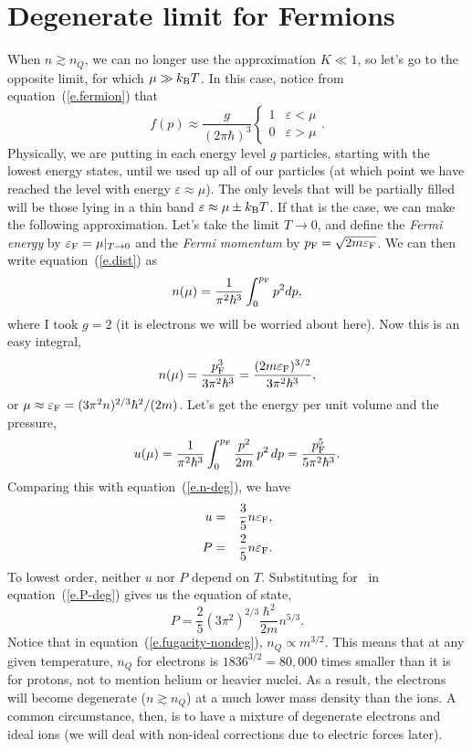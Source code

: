 \section{Degenerate limit for Fermions}\label{s.deg-limit-fermions}
When $n\gtrsim n_{Q}$, we can no longer use the approximation $K \ll 1$, so let's go to the opposite limit, for which $\mu \gg k_\mathrm{B} T$.  In this case, notice from equation~(\ref{e.fermion}) that
\begin{equation}
f(p) \approx \frac{g}{(2\pi\hbar)^{3}}\left\{\begin{array}{lr} 1 & \varepsilon < \mu\\ 0 & \varepsilon> \mu\end{array}\right. .
\end{equation}
Physically, we are putting in each energy level $g$ particles, starting with the lowest energy states, until we used up all of our particles (at which point we have reached the level with energy $\varepsilon \approx \mu$).  The only levels that will be partially filled will be those lying in a thin band $\varepsilon \approx\mu \pm k_\mathrm{B} T$.  If that is the case, we can make the following approximation.  Let's take the limit $T \to 0$, and define the \emph{Fermi energy} by $\varepsilon_{\mathrm{F}} = \mu|_{T\to 0}$ and the \emph{Fermi momentum} by $p_{\mathrm{F}} = \sqrt{2m\varepsilon_{\mathrm{F}}}$.  We can then write equation~(\ref{e.dist}) as
\begin{equation}
n(\mu) = \frac{1}{\pi^{2}\hbar^{3}}\int_{0}^{p_{\mathrm{F}}} p^{2} dp,
\end{equation}
where I took $g = 2$ (it is electrons we will be worried about here).  Now this is an easy integral,
\begin{equation}\label{e.n-deg}
n(\mu) = \frac{p_{\mathrm{F}}^{3}}{3\pi^{2}\hbar^{3}} = \frac{(2m\varepsilon_{\mathrm{F}})^{3/2}}{3\pi^{2}\hbar^{3}},
\end{equation}
or $\mu \approx \varepsilon_{\mathrm{F}} = (3\pi^{2}n)^{2/3} \hbar^{2}/(2m)$.  Let's get the energy per unit volume and the pressure,
\begin{equation}
u(\mu) = \frac{1}{\pi^{2}\hbar^{3}}\int_{0}^{p_{\mathrm{F}}} \frac{p^{2}}{2m}\,p^{2}\,dp = \frac{p_{\mathrm{F}}^{5}}{5\pi^{2}\hbar^{3}}.
\end{equation}
Comparing this with equation~(\ref{e.n-deg}), we have
\begin{eqnarray}
u &=& \frac{3}{5}n\varepsilon_{\mathrm{F}},\label{e.u-deg}\\
P &=& \frac{2}{5}n\varepsilon_{\mathrm{F}}\label{e.P-deg}.
\end{eqnarray}
To lowest order, neither $u$ nor $P$ depend on $T$.  Substituting for \eF\ in equation~(\ref{e.P-deg}) gives us the equation of state,
\begin{equation}\label{e.eos-deg}
P = \frac{2}{5}\left(3\pi^{2}\right)^{2/3}\frac{\hbar^{2}}{2m}n^{5/3}.
\end{equation}
Notice that in equation~(\ref{e.fugacity-nondeg}), $n_{Q}\propto m^{3/2}$.  This means that at any given temperature, $n_{Q}$ for electrons is $1836^{3/2} = 80,000$ times smaller than it is for protons, not to mention helium or heavier nuclei. As a result, the electrons will become degenerate ($n\gtrsim n_{Q}$) at a much lower mass density than the ions.    A common circumstance, then, is to have a mixture of degenerate electrons and ideal ions (we will deal with non-ideal corrections due to electric forces later).  

